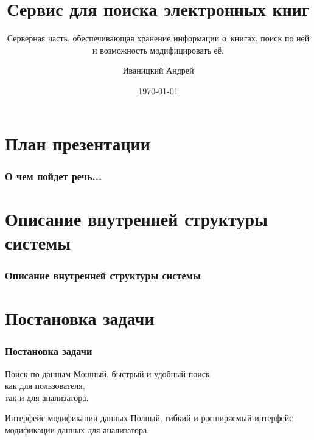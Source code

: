 \documentclass[utf8,handout]{beamer}
\title{Сервис для поиска электронных книг}
\subtitle{Серверная часть, обеспечивающая хранение информации о~книгах, поиск по ней и возможность модифицировать её.}
\author{Иваницкий Андрей}
\institute{АУ РАН}
\date{\today}
\begin{document}
\begin{frame}
	\titlepage
\end{frame}

\section*{План презентации}
	\begin{frame}
		\frametitle{О чем пойдет речь...}
		\tableofcontents[pausesections]
	\end{frame}

\section{Описание внутренней структуры системы}
	\begin{frame}
		\frametitle{Описание внутренней структуры системы}
%

	\end{frame}


\section{Постановка задачи}
	\begin{frame}
		\frametitle{Постановка задачи}
		\begin{block}{Поиск по данным}
			Мощный, быстрый и удобный поиск\\
			как для пользователя,\\
			так и для анализатора.
		\end{block}
		\begin{block}{Интерфейс модификации данных}
			Полный, гибкий и расширяемый интерфейс модификации данных для анализатора.
		\end{block}
	\end{frame}
\end{document}
